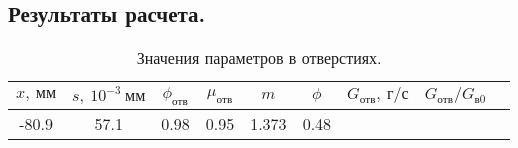 \documentclass[a4paper,10pt]{article}
\begin{document}
%    

    \subsection{Результаты расчета.}

    
    \begin{longtable}{
     |
%    
    c|
%    
    c|
%    
    c|
%    
    c|
%    
    c|
%    
    c|
%    
    c|
%    
    c|
%    
    c|
%    
    }
        \caption{Значения параметров в отверстиях.} \\
        \hline
%        

%        
        $x,\ мм$
%        

%        

%        
        & $s,\ 10^{-3}\ мм$
%        

%        

%        
        & $\phi_{отв}$
%        

%        

%        
        & $\mu_{отв}$
%        

%        

%        
        & $m$
%        

%        

%        
        & $\phi$
%        

%        

%        
        & $G_{отв},\ г/с$
%        

%        

%        
        & $G_{отв}/G_{в0}$
%        

%        
        \\
        \hline

%        

%        

%        
        -80.9
%        

%        

%        
        & 57.1
%        

%        

%        
        & 0.98
%        

%        

%        
        & 0.95
%        

%        

%        
        & 1.373
%        

%        

%        
        & 0.48
%        

%        


\end{longtable}
\end{document}
